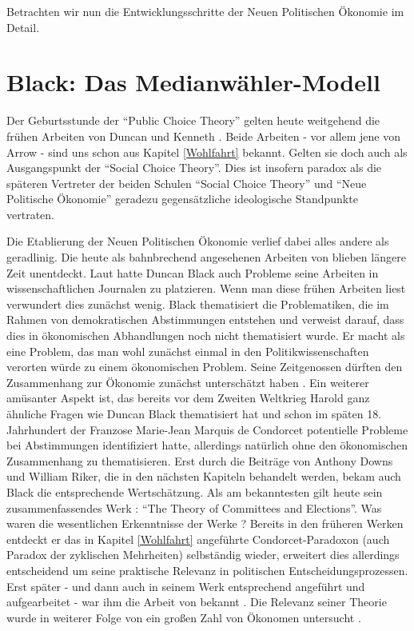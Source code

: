 Betrachten wir nun die Entwicklungsschritte der Neuen Politischen Ökonomie im Detail.


\section{Black: Das Medianwähler-Modell}

Der Geburtsstunde der "`Public Choice Theory"' gelten heute weitgehend die frühen Arbeiten von Duncan \textcite{Black1948a, Black1948b} und Kenneth \textcite{Arrow1951}. Beide Arbeiten - vor allem jene von Arrow - sind uns schon aus Kapitel \ref{Wohlfahrt} bekannt. Gelten sie doch auch als Ausgangspunkt der "`Social Choice Theory"'. Dies ist insofern paradox als die späteren Vertreter der beiden Schulen "`Social Choice Theory"' und "`Neue Politische Ökonomie"' geradezu gegensätzliche ideologische Standpunkte vertraten.

Die Etablierung der Neuen Politischen Ökonomie verlief dabei alles andere als geradlinig. Die heute als bahnbrechend angesehenen Arbeiten von \textcite{Black1948a, Black1948b} blieben längere Zeit unentdeckt. Laut \textcite{Grofman2004} hatte Duncan Black auch Probleme seine Arbeiten in wissenschaftlichen Journalen zu platzieren. Wenn man diese frühen Arbeiten liest verwundert dies zunächst wenig. Black thematisiert die Problematiken, die im Rahmen von demokratischen Abstimmungen entstehen und verweist darauf, dass dies in ökonomischen Abhandlungen noch nicht thematisiert wurde. Er macht als eine Problem, das man wohl zunächst einmal in den Politikwissenschaften verorten würde zu einem ökonomischen Problem. Seine Zeitgenossen dürften den Zusammenhang zur Ökonomie zunächst unterschätzt haben \parencite[S. 33]{Grofman2004}. Ein weiterer amüsanter Aspekt ist, das bereits vor dem Zweiten Weltkrieg Harold \textcite{Hotelling1929} ganz ähnliche Fragen wie Duncan Black thematisiert hat und  schon im späten 18. Jahrhundert der Franzose Marie-Jean Marquis de Condorcet potentielle Probleme bei Abstimmungen identifiziert hatte, allerdings natürlich ohne den ökonomischen Zusammenhang zu thematisieren. Erst durch die Beiträge von Anthony Downs und William Riker, die in den nächsten Kapiteln behandelt werden, bekam auch Black die entsprechende Wertschätzung.
Als am bekanntesten gilt heute sein zusammenfassendes Werk \textcite{Black1958}: "`The Theory of Committees and Elections"'. Was waren die wesentlichen Erkenntnisse der Werke \textcite{Black1948a, Black1948b, Black1958}? Bereits in den früheren Werken entdeckt er das in Kapitel \ref{Wohlfahrt} angeführte Condorcet-Paradoxon (auch Paradox der zyklischen Mehrheiten) selbständig wieder, erweitert dies allerdings entscheidend um seine praktische Relevanz in politischen Entscheidungsprozessen. Erst später - und dann auch in seinem Werk \textcite{Black1958} entsprechend angeführt und aufgearbeitet - war ihm die Arbeit von \textcite{Condorcet1785} bekannt \parencite[S. 14]{Tullock1981}. Die Relevanz seiner Theorie wurde in weiterer Folge von ein großen Zahl von Ökonomen untersucht \parencite[S. 17f]{Tullock1981}.

